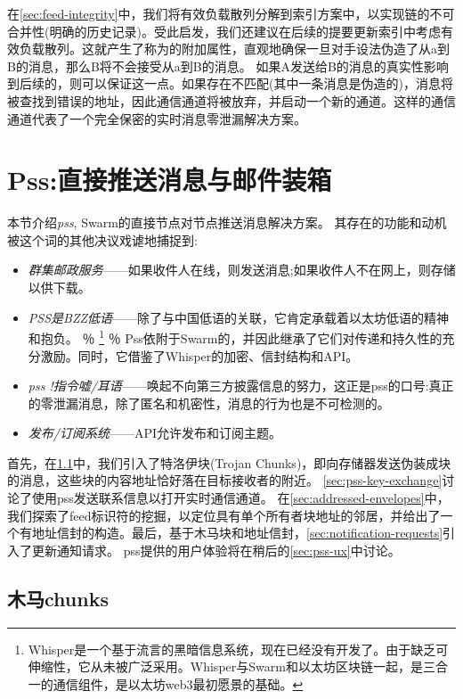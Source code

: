 在\ref{sec:feed-integrity}中，我们将有效负载散列分解到索引方案中，以实现链的不可合并性(明确的历史记录)。受此启发，我们还建议在后续的提要更新索引中考虑有效负载散列。这就产生了称为的附加属性，直观地确保一旦对手设法伪造了从a到B的消息，那么B将不会接受从a到B的消息。
如果A发送给B的消息的真实性影响到后续的，则可以保证这一点。如果存在不匹配(其中一条消息是伪造的)，消息将被查找到错误的地址，因此通信通道将被放弃，并启动一个新的通道。这样的通信通道代表了一个完全保密的实时消息零泄漏解决方案。




\section{Pss:直接推送消息与邮件装箱\statusgreen}\label{sec:pss}

\green{}

本节介绍\emph{pss}, Swarm的直接节点对节点推送消息解决方案。
其存在的功能和动机被这个词的其他决议戏谑地捕捉到:

\begin{itemize}
\item \emph{群集邮政服务}——如果收件人在线，则发送消息;如果收件人不在网上，则存储以供下载。
\item \emph{PSS是BZZ低语}——除了与中国低语的关联，它肯定承载着以太坊低语的精神和抱负。%
％
\footnote{Whisper是一个基于流言的黑暗信息系统，现在已经没有开发了。由于缺乏可伸缩性，它从未被广泛采用。Whisper与Swarm和以太坊区块链一起，是三合一的通信组件，是以太坊web3最初愿景的基础。}
％
Pss依附于Swarm的，并因此继承了它们对传递和持久性的充分激励。同时，它借鉴了Whisper的加密、信封结构和API。
\item \emph{pss !指令嘘/耳语}——唤起不向第三方披露信息的努力，这正是pss的口号:真正的零泄漏消息，除了匿名和机密性，消息的行为也是不可检测的。
\item  \emph{发布/订阅系统}——API允许发布和订阅主题。
\end{itemize}

首先，在\ref{sec:trojan}中，我们引入了特洛伊块(Trojan Chunks)，即向存储器发送伪装成块的消息，这些块的内容地址恰好落在目标接收者的附近。 
\ref{sec:pss-key-exchange}讨论了使用pss发送联系信息以打开实时通信通道。
在\ref{sec:addressed-envelopes}中，我们探索了feed标识符的挖掘，以定位具有单个所有者块地址的邻居，并给出了一个有地址信封的构造。最后，基于木马块和地址信封，\ref{sec:notification-requests}引入了更新通知请求。
pss提供的用户体验将在稍后的\ref{sec:pss-ux}中讨论。 

\subsection{木马chunks\statusgreen}\label{sec:trojan}

